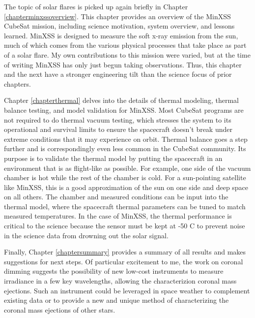 The topic of solar flares is picked up again briefly in Chapter \ref{chapterminxssoverview}. This chapter provides an overview of the MinXSS CubeSat mission, including science motivation, system overview, and lessons learned. MinXSS is designed to measure the soft x-ray emission from the sun, much of which comes from the various physical processes that take place as part of a solar flare. My own contributions to this mission were varied, but at the time of writing MinXSS has only just begun taking observations. Thus, this chapter and the next have a stronger engineering tilt than the science focus of prior chapters. 

Chapter \ref{chapterthermal} delves into the details of thermal modeling, thermal balance testing, and model validation for MinXSS. Most CubeSat programs are not required to do thermal vacuum testing, which stresses the system to its operational and survival limits to ensure the spacecraft doesn't break under extreme conditions that it may experience on orbit. Thermal balance goes a step further and is correspondingly even less common in the CubeSat community. Its purpose is to validate the thermal model by putting the spacecraft in an environment that is as flight-like as possible. For example, one side of the vacuum chamber is hot while the rest of the chamber is cold. For a sun-pointing satellite like MinXSS, this is a good approximation of the sun on one side and deep space on all others. The chamber and measured conditions can be input into the thermal model, where the spacecraft thermal parameters can be tuned to match measured temperatures. In the case of MinXSS, the thermal performance is critical to the science because the sensor must be kept at -50 \degree C to prevent noise in the science data from drowning out the solar signal. 

Finally, Chapter \ref{chaptersummary} provides a summary of all results and makes suggestions for next steps. Of particular excitement to me, the work on coronal dimming suggests the possibility of new low-cost instruments to measure irradiance in a few key wavelengths, allowing the characterizion coronal mass ejections. Such an instrument could be leveraged in space weather to complement existing data or to provide a new and unique method of characterizing the coronal mass ejections of other stars. 
